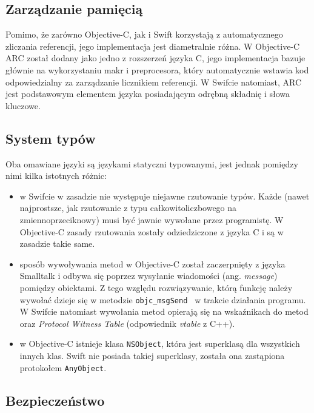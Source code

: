 \documentclass[mgr, shortabstract]{iithesis}
\newcommand{\ang}[1]{ang. \textit{#1}}
\begin{document}
\subsection{Zarządzanie pamięcią}

Pomimo, że zarówno Objective-C, jak i Swift korzystają z automatycznego zliczania referencji, jego implementacja jest diametralnie różna. W Objective-C ARC został dodany jako jedno z rozszerzeń języka C, jego implementacja bazuje głównie na wykorzystaniu makr i preprocesora, który automatycznie wstawia kod odpowiedzialny za zarządzanie licznikiem referencji. W Swifcie natomiast, ARC jest podstawowym elementem języka posiadającym odrębną składnię i słowa kluczowe.

\subsection{System typów}
\label{s:system_typow}

Oba omawiane języki są językami statyczni typowanymi, jest jednak pomiędzy nimi kilka istotnych różnic:

\begin{itemize}

    \item w Swifcie w zasadzie nie występuje niejawne rzutowanie typów. Każde (nawet najprostsze, jak rzutowanie z typu całkowitoliczbowego na zmiennoprzeciknowy) musi być jawnie wywołane przez programistę. W Objective-C zasady rzutowania zostały odziedziczone z języka C i są w zasadzie takie same.
    \item sposób wywoływania metod w Objective-C został zaczerpnięty z języka Smalltalk i odbywa się poprzez wysyłanie wiadomości (\ang{message}) pomiędzy obiektami. Z tego względu rozwiązywanie, którą funkcję należy wywołać dzieje się w metodzie \texttt{objc_msgSend } w trakcie działania programu. W Swifcie natomiast wywołania metod opierają się na wskaźnikach do metod oraz \textit{Protocol Witness Table} (odpowiednik \textit{vtable} z C++).
    \item w Objective-C istnieje klasa \texttt{NSObject}, która jest superklasą dla wszystkich innych klas. Swift nie posiada takiej superklasy, została ona zastąpiona protokołem \texttt{AnyObject}.

\end{itemize}

\subsection{Bezpieczeństwo}
\end{document}
